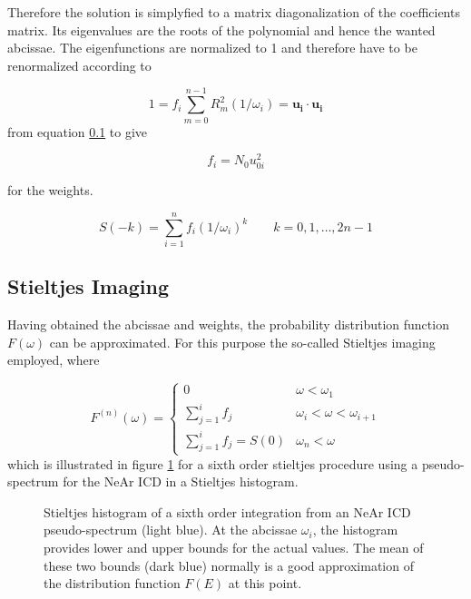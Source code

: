 Therefore the solution is simplyfied to a matrix diagonalization
of the coefficients matrix. Its eigenvalues are the roots of the polynomial
and hence the wanted abcissae. The eigenfunctions are normalized to 1 and therefore
have to be renormalized according to

\begin{equation}
  1 = f_i \sum\limits_{m=0}^{n-1} R_m^2 (1/\omega_i) = \mathbf{u_i} \cdot \mathbf{u_i}
\end{equation}
from equation \ref{} to give

\begin{equation}
  f_i = N_0 u_{0i}^2
\end{equation}

for the weights.

\begin{equation}
  S(-k) = \sum\limits_{i=1}^n f_i (1/\omega_i)^k \quad\quad k=0,1,\dots,2n-1
\end{equation}





\subsection{Stieltjes Imaging}
Having obtained the abcissae and weights, the probability distribution function
$F(\omega)$ can be approximated. For this purpose the so-called Stieltjes imaging
employed, where

\begin{equation}
  F^{(n)} (\omega) =
  \begin{cases}
    0                                & \omega < \omega_1\\
    \sum\limits_{j=1}^{i} f_j        & \omega_i < \omega < \omega_{i+1}\\
    \sum\limits_{j=1}^{i} f_j = S(0) & \omega_n < \omega 
  \end{cases}
\end{equation}
which is illustrated in figure \ref{figure:stieltjes_imaging} for a sixth
order stieltjes procedure using a pseudo-spectrum for the NeAr ICD in a
Stieltjes histogram.


\begin{figure}[h]
  \centering
  
  \caption{Stieltjes histogram of a sixth order integration from
           an NeAr ICD pseudo-spectrum (light blue). At the abcissae $\omega_i$,
           the histogram provides lower and upper bounds for the actual
           values. The mean of these two bounds (dark blue) normally is a good
           approximation of the distribution function $F(E)$ at this point.}
  \label{figure:stieltjes_imaging}
\end{figure}

